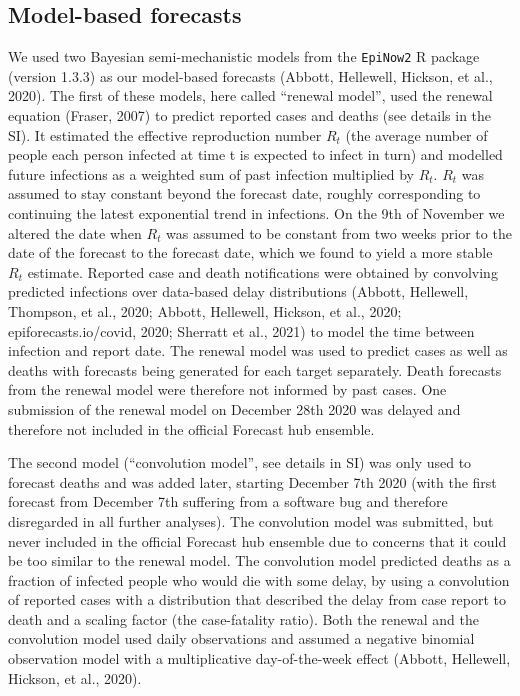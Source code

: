 \documentclass[
]{article}
\begin{document}
\hypertarget{model-based-forecasts}{%
\subsection{Model-based forecasts}\label{model-based-forecasts}}

We used two Bayesian semi-mechanistic models from the \texttt{EpiNow2} R package (version 1.3.3) as our model-based forecasts (Abbott, Hellewell, Hickson, et al., 2020). The first of these models, here called ``renewal model'', used the renewal equation (Fraser, 2007) to predict reported cases and deaths (see details in the SI). It estimated the effective reproduction number \(R_t\) (the average number of people each person infected at time t is expected to infect in turn) and modelled future infections as a weighted sum of past infection multiplied by \(R_t\). \(R_t\) was assumed to stay constant beyond the forecast date, roughly corresponding to continuing the latest exponential trend in infections. On the 9th of November we altered the date when \(R_t\) was assumed to be constant from two weeks prior to the date of the forecast to the forecast date, which we found to yield a more stable \(R_t\) estimate. Reported case and death notifications were obtained by convolving predicted infections over data-based delay distributions (Abbott, Hellewell, Thompson, et al., 2020; Abbott, Hellewell, Hickson, et al., 2020; epiforecasts.io/covid, 2020; Sherratt et al., 2021) to model the time between infection and report date. The renewal model was used to predict cases as well as deaths with forecasts being generated for each target separately. Death forecasts from the renewal model were therefore not informed by past cases. One submission of the renewal model on December 28th 2020 was delayed and therefore not included in the official Forecast hub ensemble.

The second model (``convolution model'', see details in SI) was only used to forecast deaths and was added later, starting December 7th 2020 (with the first forecast from December 7th suffering from a software bug and therefore disregarded in all further analyses). The convolution model was submitted, but never included in the official Forecast hub ensemble due to concerns that it could be too similar to the renewal model. The convolution model predicted deaths as a fraction of infected people who would die with some delay, by using a convolution of reported cases with a distribution that described the delay from case report to death and a scaling factor (the case-fatality ratio). Both the renewal and the convolution model used daily observations and assumed a negative binomial observation model with a multiplicative day-of-the-week effect (Abbott, Hellewell, Hickson, et al., 2020).
\end{document}
